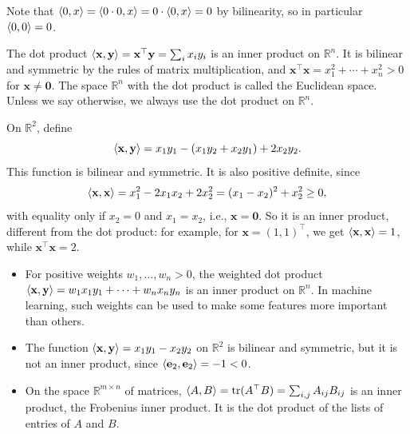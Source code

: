 Note that $\langle 0, x \rangle = \langle 0 \cdot 0, x \rangle = 0 \cdot \langle 0, x \rangle = 0$ by bilinearity, so in particular $\langle 0, 0 \rangle = 0$.

\begin{example}\label{L2-ex:dot}
    The dot product $\langle \mathbf{x}, \mathbf{y} \rangle = \mathbf{x}^\top \mathbf{y} = \sum_i x_i y_i$ is an inner product on $\mathbb{R}^n$. It is bilinear and symmetric by the rules of matrix multiplication, and $\mathbf{x}^\top \mathbf{x} = x_1^2 + \cdots + x_n^2 > 0$ for $\mathbf{x} \neq \mathbf{0}$. The space $\mathbb{R}^n$ with the dot product is called the Euclidean space. Unless we say otherwise, we always use the dot product on $\mathbb{R}^n$.
\end{example}

\begin{example}\label{L2-ex:ip-A}
    On $\mathbb{R}^2$, define
    \[\langle \mathbf{x}, \mathbf{y} \rangle = x_1 y_1 - (x_1 y_2 + x_2 y_1) + 2 x_2 y_2.\]
    This function is bilinear and symmetric. It is also positive definite, since
    \[\langle \mathbf{x}, \mathbf{x} \rangle = x_1^2 - 2 x_1 x_2 + 2 x_2^2 = (x_1 - x_2)^2 + x_2^2 \geq 0,\]
    with equality only if $x_2 = 0$ and $x_1 = x_2$, i.e., $\mathbf{x} = \mathbf{0}$. So it is an inner product, different from the dot product: for example, for $\mathbf{x} = (1, 1)^\top$, we get $\langle \mathbf{x}, \mathbf{x} \rangle = 1$, while $\mathbf{x}^\top \mathbf{x} = 2$.
\end{example}

\begin{example}
    \begin{itemize}
        \item For positive weights $w_1, \ldots, w_n > 0$, the weighted dot product $\langle \mathbf{x}, \mathbf{y} \rangle = w_1 x_1 y_1 + \cdots + w_n x_n y_n$ is an inner product on $\mathbb{R}^n$. In machine learning, such weights can be used to make some features more important than others.
        \item The function $\langle \mathbf{x}, \mathbf{y} \rangle = x_1 y_1 - x_2 y_2$ on $\mathbb{R}^2$ is bilinear and symmetric, but it is not an inner product, since $\langle \mathbf{e}_2, \mathbf{e}_2 \rangle = -1 < 0$.
        \item On the space $\mathbb{R}^{m \times n}$ of matrices, $\langle A, B \rangle = \operatorname{tr}(A^\top B) = \sum_{i, j} A_{ij} B_{ij}$ is an inner product, the Frobenius inner product. It is the dot product of the lists of entries of $A$ and $B$.
    \end{itemize}
\end{example}

